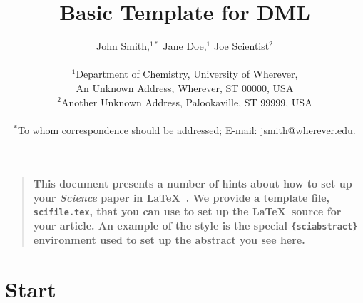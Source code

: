 \documentclass[12pt]{article}
\title{Basic Template for DML}
\author
{John Smith,$^{1\ast}$ Jane Doe,$^{1}$ Joe Scientist$^{2}$\\
\\
\normalsize{$^{1}$Department of Chemistry, University of Wherever,}\\
\normalsize{An Unknown Address, Wherever, ST 00000, USA}\\
\normalsize{$^{2}$Another Unknown Address, Palookaville, ST 99999, USA}\\
\\
\normalsize{$^\ast$To whom correspondence should be addressed; E-mail:  jsmith@wherever.edu.}
}
\date{}
\newenvironment{sciabstract}{%
\begin{quote} \bf}
{\end{quote}}
\begin{document}
 


\baselineskip24pt


\maketitle 




\begin{sciabstract}
  This document presents a number of hints about how to set up your
  {\it Science\/} paper in \LaTeX\ .  We provide a template file,
  \texttt{scifile.tex}, that you can use to set up the \LaTeX\ source
  for your article.  An example of the style is the special
  \texttt{\{sciabstract\}} environment used to set up the abstract you
  see here.
\end{sciabstract}




\section*{Start}
\end{document}
